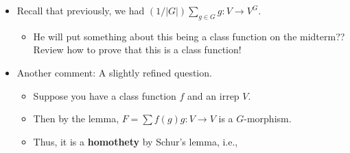 \documentclass[../notes.tex]{subfiles}
\begin{document}
\begin{itemize}
    \begin{equation*}
        F = \sum_{g\in G}f(g)\cdot g:V\to V
    \end{equation*}
    is a morphism of $G$-representations, that is, $F\in\Hom_G(V,V)$.
    \begin{proof}
        To prove that $F\in\Hom_G(V,V)$, it will suffice to show that $xF=Fx$ for every $x\in G$. Let $x\in G$ be arbitrary. Then
        \begin{align*}
            F(xv) &= \sum_{g\in G}f(g)gxv
            \intertext{Since $\rho$ is a group homomorphism, the functions $\rho(g)\in GL(V)$ act just like the elements $g\in G$. \emph{This} is what justifies us to basically move everything around all willy-nilly. Thus, continuing from the above, we have}
            &= \sum_{g\in G}f(g)(xx^{-1})gxv\\
            &= \sum_{g\in G}f(g)x(x^{-1}gx)v\\
            \intertext{Since $x=\rho(x)$ is in the general \emph{linear} group, i.e., is a \emph{linear} map, we can factor it out of the sum of functions to get}
            &= x\left( \sum_{g\in G}f(g)x^{-1}gx \right)v\\
            \intertext{Since $f$ is a class function by hypothesis, we have $f(g)=f(x^{-1}gx)$, so}
            &= x\left( \sum_{g\in G}f(x^{-1}gx)x^{-1}gxv \right)\\
            &= x\sum_{g\in G}f(g)gv\\
            &= x(Fv)
        \end{align*}
        as desired.
    \end{proof}
    \item Recall that previously, we had $(1/|G|)\sum_{g\in G}g:V\to V^G$.
    \begin{itemize}
        \item He will put something about this being a class function on the midterm?? Review how to prove that this is a class function!
    \end{itemize}
    \item Another comment: A slightly refined question.
    \begin{itemize}
        \item Suppose you have a class function $f$ and an irrep $V$.
        \item Then by the lemma, $F=\sum f(g)g:V\to V$ is a $G$-morphism.
        \item Thus, it is a \textbf{homothety} by Schur's lemma, i.e.,
        \begin{equation*}

\end{equation*}
\end{itemize}
\end{itemize}
\end{document}

